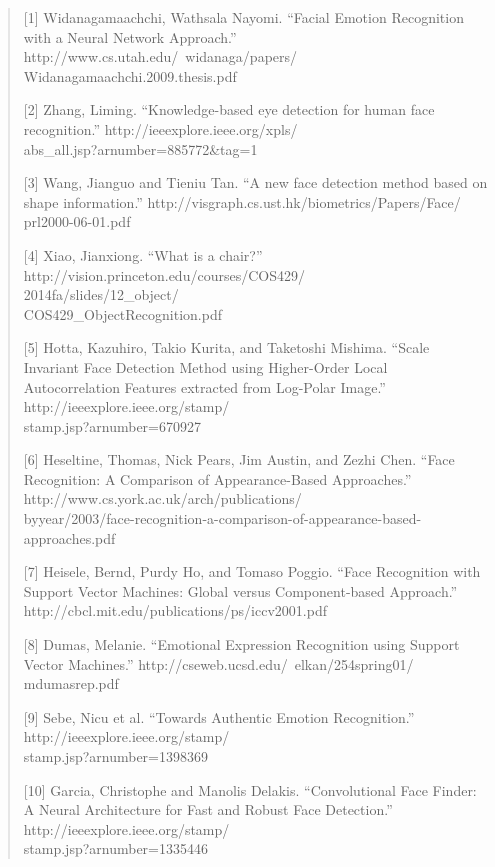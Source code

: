 \documentclass[10pt,twocolumn,letterpaper]{article}
\begin{document}
\begin{quote}
[1] Widanagamaachchi, Wathsala Nayomi. ``Facial Emotion Recognition with a Neural Network Approach.'' http://www.cs.utah.edu/~widanaga/papers/ \\ Widanagamaachchi.2009.thesis.pdf

[2] Zhang, Liming. ``Knowledge-based eye detection for human face recognition.'' http://ieeexplore.ieee.org/xpls/ \\ abs\_all.jsp?arnumber=885772\&tag=1

[3] Wang, Jianguo and Tieniu Tan. ``A new face detection method based on shape information.'' http://visgraph.cs.ust.hk/biometrics/Papers/Face/ \\ prl2000-06-01.pdf

[4] Xiao, Jianxiong. ``What is a chair?'' http://vision.princeton.edu/courses/COS429/ \\ 2014fa/slides/12\_object/ \\ COS429\_ObjectRecognition.pdf

[5] Hotta, Kazuhiro, Takio Kurita, and Taketoshi Mishima. ``Scale Invariant Face Detection Method using Higher-Order Local Autocorrelation Features extracted from Log-Polar Image.'' http://ieeexplore.ieee.org/stamp/ \\ stamp.jsp?arnumber=670927

[6] Heseltine, Thomas, Nick Pears, Jim Austin, and Zezhi Chen. ``Face Recognition: A Comparison of Appearance-Based Approaches.'' http://www.cs.york.ac.uk/arch/publications/ \\ byyear/2003/face-recognition-a-comparison-of-appearance-based-approaches.pdf

[7] Heisele, Bernd, Purdy Ho, and Tomaso Poggio. ``Face Recognition with Support Vector Machines: Global versus Component-based Approach.'' http://cbcl.mit.edu/publications/ps/iccv2001.pdf

[8] Dumas, Melanie. ``Emotional Expression Recognition using Support Vector Machines.'' http://cseweb.ucsd.edu/~elkan/254spring01/ \\ mdumasrep.pdf

[9] Sebe, Nicu et al. ``Towards Authentic Emotion Recognition.'' http://ieeexplore.ieee.org/stamp/ \\ stamp.jsp?arnumber=1398369

[10] Garcia, Christophe and Manolis Delakis. ``Convolutional Face Finder: A Neural Architecture for Fast and Robust Face Detection.'' http://ieeexplore.ieee.org/stamp/ \\ stamp.jsp?arnumber=1335446


\end{quote}
\end{document}
